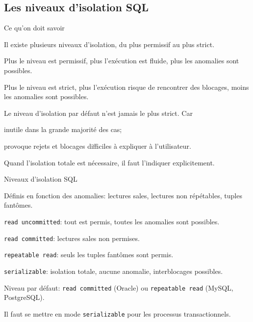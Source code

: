 

\subsection{Les niveaux d'isolation SQL}

\begin{frame}{Ce qu'on doit savoir }

\alert{Il existe plusieurs niveaux d'isolation, du plus permissif au plus strict}.

\vfill

Plus le niveau est permissif, plus l'exécution est fluide, plus les anomalies sont possibles.

\vfill

Plus le niveau est strict, plus l'exécution risque de rencontrer des blocages, moins
les anomalies sont possibles.

\vfill

\alert{Le niveau d'isolation par défaut n'est jamais le plus strict}. Car

\begin{redbullet}
  \item inutile dans la grande majorité des cas;
  \item provoque rejets et blocages difficiles à expliquer à l'utilisateur.  
\end{redbullet}

\vfill

\begin{blocgauche}
\alert{Quand l'isolation totale est nécessaire, il faut l'indiquer explicitement.}  
\end{blocgauche}
\end{frame}

\begin{frame}{Niveaux d'isolation SQL}

Définis en fonction des anomalies: lectures sales,  lectures non répétables, tuples fantômes.

\begin{redbullet}
  \item \texttt{read uncommitted}: tout est permis, toutes les anomalies sont possibles.
  
  \item \texttt{read committed}: lectures sales non permises.
  
  \item \texttt{repeatable read}: seuls les tuples fantômes sont permis.
  
  \item \texttt{serializable}: isolation totale, aucune anomalie, interblocages possibles.
\end{redbullet}

Niveau par défaut: \texttt{read committed} (Oracle) ou \texttt{repeatable read} (MySQL, PostgreSQL).
 
 \vfill
 
 
\begin{blocgauche}
\alert{Il faut se mettre en mode \texttt{serializable} pour les processus transactionnels.}
\end{blocgauche}

\end{frame}

